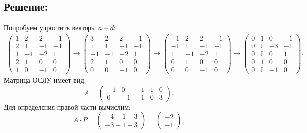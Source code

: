 \documentclass[12pt]{article}
\begin{document}
    \subsection*{Решение:}
    Попробуем упростить векторы $a$ -- $d$:
    \begin{gather*}
        \begin{pmatrix}
            1 & 2  & 2  & -1 \\
            2 & 1  & -1 & -1 \\
            1 & -1 & -2 & 1  \\
            2 & 1  & 0  & 0  \\
            1 & 0  & -1 & 0
        \end{pmatrix}
        \rightarrow
        \begin{pmatrix}
            3  & 2  & 2  & -1 \\
            1  & 1  & -1 & -1 \\
            -1 & -1 & -2 & 1  \\
            2  & 1  & 0  & 0  \\
            0  & 0  & -1 & 0
        \end{pmatrix}
        \rightarrow
        \begin{pmatrix}
            -1 & 2  & 2  & -1 \\
            -1 & 1  & -1 & -1 \\
            1  & -1 & -2 & 1  \\
            0  & 1  & 0  & 0  \\
            0  & 0  & -1 & 0
        \end{pmatrix}
        \rightarrow
        \begin{pmatrix}
            0 & 1 & 0  & -1 \\
            0 & 0 & -3 & -1 \\
            0 & 0 & 0  & 1  \\
            0 & 1 & 0  & 0  \\
            0 & 0 & -1 & 0
        \end{pmatrix}
        .
    \end{gather*}
    Матрица ОСЛУ имеет вид:
    \[
        A =
        \begin{pmatrix}
            -1 & 0  & -1 & 1 & 0 \\
            0  & -1 & -1 & 0 & 3
        \end{pmatrix}.
    \]
    Для определения правой части вычислим:
    \[
        A \cdot P =
        \begin{pmatrix}
            -4 - 1 + 3 \\
            -3 - 1 + 3
        \end{pmatrix}
        =
        \begin{pmatrix}
            -2 \\
            -1
        \end{pmatrix}
        .
    \]
\end{document}
